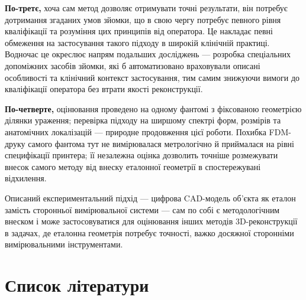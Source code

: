 \documentclass[
  ukrainian,
  10pt,
  a4paper,
  twocolumn]{article}
\begin{document}
\textbf{По-третє,} хоча сам метод дозволяє отримувати точні результати,
він потребує дотримання згаданих умов зйомки, що в свою чергу потребує
певного рівня кваліфікації та розуміння цих принципів від оператора. Це
накладає певні обмеження на застосування такого підходу в широкій
клінічній практиці. Водночас це окреслює напрям подальших досліджень ---
розробка спеціальних допоміжних засобів зйомки, які б автоматизовано
враховували описані особливості та клінічний контекст застосування, тим
самим знижуючи вимоги до кваліфікації оператора без втрати якості
реконструкції.

\textbf{По-четверте,} оцінювання проведено на одному фантомі з
фіксованою геометрією ділянки ураження; перевірка підходу на ширшому
спектрі форм, розмірів та анатомічних локалізацій --- природне
продовження цієї роботи. Похибка FDM-друку самого фантома тут не
вимірювалася метрологічно й приймалася на рівні специфікації принтера;
її незалежна оцінка дозволить точніше розмежувати внесок самого методу
від внеску еталонної геометрії в спостережувані відхилення.

Описаний експериментальний підхід --- цифрова CAD-модель об'єкта як
еталон замість сторонньої вимірювальної системи --- сам по собі є
методологічним внеском і може застосовуватися для оцінювання інших
методів 3D-реконструкції в задачах, де еталонна геометрія потребує
точності, важко досяжної сторонніми вимірювальними інструментами.

\clearpage

\section*{Список
літератури}\label{ux441ux43fux438ux441ux43eux43a-ux43bux456ux442ux435ux440ux430ux442ux443ux440ux438}
\end{document}
